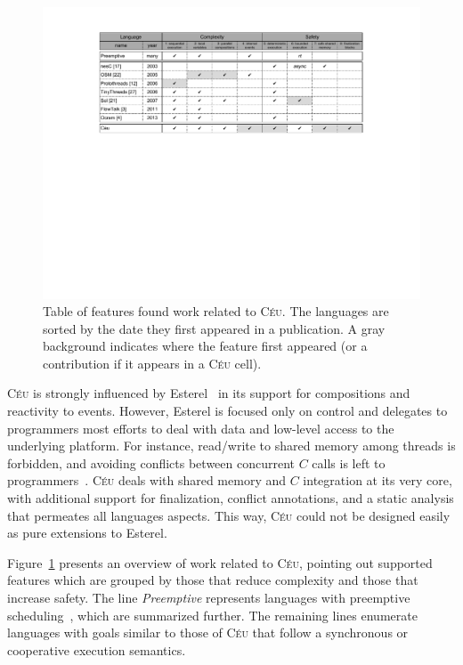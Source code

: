 \documentclass[letterpaper]{sig-alternate}
\newcommand{\CEU}{\textsc{C\'{e}u}\xspace}
\begin{document}
\begin{figure}[t]
\includegraphics[width=\textwidth,clip=true,trim=110px 340px 120px 0px]{related}
\caption{ Table of features found work related to \CEU. \newline
{\small %
The languages are sorted by the date they first appeared in a publication.
A gray background indicates where the feature first appeared (or a contribution 
if it appears in a \CEU cell).
}%
\label{fig.related}
}
\end{figure}

\CEU is strongly influenced by Esterel~\cite{esterel.ieee91} in its support for 
compositions and reactivity to events.
However, Esterel is focused only on control and delegates to programmers most 
efforts to deal with data and low-level access to the underlying platform.
For instance, read/write to shared memory among threads is forbidden, and 
avoiding conflicts between concurrent $C$ calls is left to 
programmers~\cite{esterel.primer}.
\CEU deals with shared memory and $C$ integration at its very core, with 
additional support for finalization, conflict annotations, and a static 
analysis that permeates all languages aspects.
This way, \CEU could not be designed easily as pure extensions to Esterel.

Figure~\ref{fig.related} presents an overview of work related to \CEU, pointing 
out supported features which are grouped by those that reduce complexity and 
those that increase safety.
The line \emph{Preemptive} represents languages with preemptive 
scheduling~\cite{wsn.mantisos,wsn.tosthreads}, which are summarized further.
The remaining lines enumerate languages with goals similar to those of \CEU 
that follow a synchronous or cooperative execution semantics.
\end{document}
